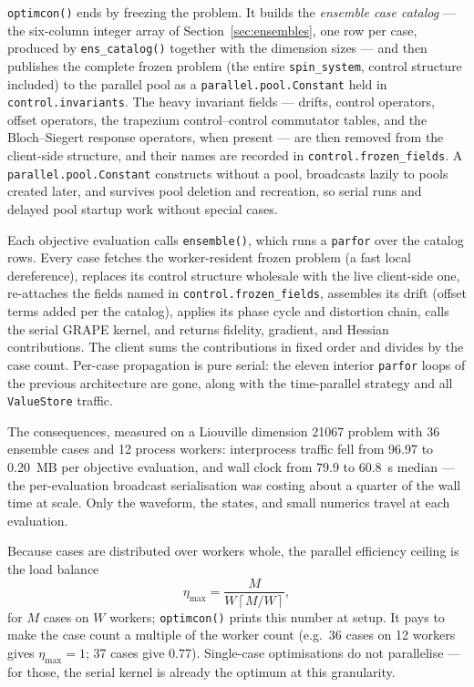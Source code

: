 \documentclass[11pt,a4paper]{article}
\newcommand{\code}[1]{\texttt{#1}}
\begin{document}
\code{optimcon()} ends by freezing the problem. It builds the
\emph{ensemble case catalog} --- the six-column integer array of
Section~\ref{sec:ensembles}, one row per case, produced by
\code{ens\_catalog()} together with the dimension sizes --- and then
publishes the complete frozen problem (the entire \code{spin\_system},
control structure included) to the parallel pool as a
\code{parallel.pool.Constant} held in \code{control.invariants}. The
heavy invariant fields --- drifts, control operators, offset operators,
the trapezium control--control commutator tables, and the Bloch--Siegert
response operators, when present --- are then removed from the
client-side structure, and their names are recorded in
\code{control.frozen\_fields}. A
\code{parallel.pool.Constant} constructs without a pool, broadcasts
lazily to pools created later, and survives pool deletion and recreation,
so serial runs and delayed pool startup work without special cases.

Each objective evaluation calls \code{ensemble()}, which runs a
\code{parfor} over the catalog rows. Every case fetches the
worker-resident frozen problem (a fast local dereference), replaces its
control structure wholesale with the live client-side one, re-attaches
the fields named in \code{control.frozen\_fields}, assembles its
drift (offset terms added per the catalog), applies its phase cycle and
distortion chain, calls the serial GRAPE kernel, and returns fidelity,
gradient, and Hessian contributions. The client sums the contributions in
fixed order and divides by the case count. Per-case propagation is pure
serial: the eleven interior \code{parfor} loops of the previous
architecture are gone, along with the time-parallel strategy and all
\code{ValueStore} traffic.

The consequences, measured on a Liouville dimension 21067 problem with
36 ensemble cases and 12 process workers: interprocess traffic fell from
96.97 to 0.20~MB per objective evaluation, and wall clock from 79.9 to
60.8~s median --- the per-evaluation broadcast serialisation was costing
about a quarter of the wall time at scale. Only the waveform, the states,
and small numerics travel at each evaluation.

Because cases are distributed over workers whole, the parallel
efficiency ceiling is the load balance
\begin{equation}
  \eta_{\max}
  =\frac{M}{W\left\lceil M/W\right\rceil},
\end{equation}
for $M$ cases on $W$ workers; \code{optimcon()} prints this number at
setup. It pays to make the case count a multiple of the worker count
(e.g.\ 36 cases on 12 workers gives $\eta_{\max}=1$; 37 cases give
$0.77$). Single-case optimisations do not parallelise --- for those, the
serial kernel is already the optimum at this granularity.
\end{document}
